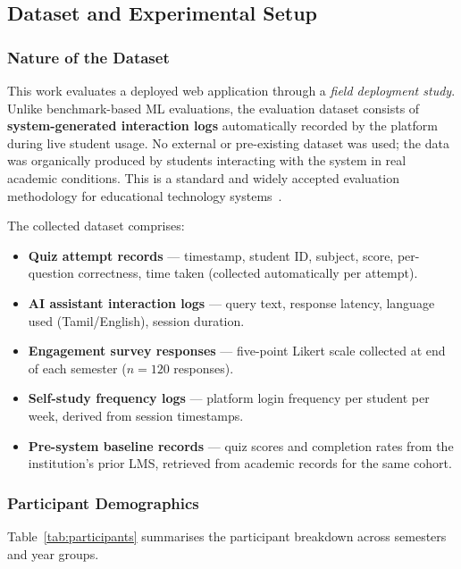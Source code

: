 \documentclass[conference]{IEEEtran}
\begin{document}
\subsection{Dataset and Experimental Setup}

\subsubsection{Nature of the Dataset}

This work evaluates a deployed web application through a \textit{field deployment study}. Unlike benchmark-based ML evaluations, the evaluation dataset consists of \textbf{system-generated interaction logs} automatically recorded by the platform during live student usage. No external or pre-existing dataset was used; the data was organically produced by students interacting with the system in real academic conditions. This is a standard and widely accepted evaluation methodology for educational technology systems~\cite{zawacki2019, guo2022}.

The collected dataset comprises:
\begin{itemize}
  \item \textbf{Quiz attempt records} — timestamp, student ID, subject, score, per-question correctness, time taken (collected automatically per attempt).
  \item \textbf{AI assistant interaction logs} — query text, response latency, language used (Tamil/English), session duration.
  \item \textbf{Engagement survey responses} — five-point Likert scale collected at end of each semester ($n = 120$ responses).
  \item \textbf{Self-study frequency logs} — platform login frequency per student per week, derived from session timestamps.
  \item \textbf{Pre-system baseline records} — quiz scores and completion rates from the institution's prior LMS, retrieved from academic records for the same cohort.
\end{itemize}

\subsubsection{Participant Demographics}

Table~\ref{tab:participants} summarises the participant breakdown across semesters and year groups.
\end{document}
